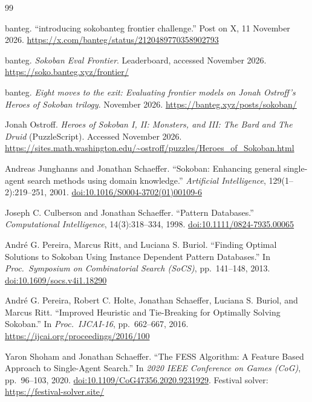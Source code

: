 \documentclass[11pt,a4paper]{article}
\begin{document}
{\raggedright
\begin{thebibliography}{99}

banteg. ``introducing sokobanteg frontier challenge.'' Post on X, 11 November 2026. \url{https://x.com/banteg/status/2120489770358902793}

banteg. \emph{Sokoban Eval Frontier}. Leaderboard, accessed November 2026. \url{https://soko.banteg.xyz/frontier/}

banteg. \emph{Eight moves to the exit: Evaluating frontier models on Jonah Ostroff's Heroes of Sokoban trilogy}. November 2026. \url{https://banteg.xyz/posts/sokoban/}

Jonah Ostroff. \emph{Heroes of Sokoban I, II: Monsters, and III: The Bard and The Druid} (PuzzleScript). Accessed November 2026. \url{https://sites.math.washington.edu/~ostroff/puzzles/Heroes_of_Sokoban.html}

Andreas Junghanns and Jonathan Schaeffer. ``Sokoban: Enhancing general single-agent search methods using domain knowledge.'' \emph{Artificial Intelligence}, 129(1--2):219--251, 2001. \href{https://doi.org/10.1016/S0004-3702(01)00109-6}{doi:10.1016/S0004-3702(01)00109-6}

Joseph C. Culberson and Jonathan Schaeffer. ``Pattern Databases.'' \emph{Computational Intelligence}, 14(3):318--334, 1998. \href{https://doi.org/10.1111/0824-7935.00065}{doi:10.1111/0824-7935.00065}

Andr\'e G. Pereira, Marcus Ritt, and Luciana S. Buriol. ``Finding Optimal Solutions to Sokoban Using Instance Dependent Pattern Databases.'' In \emph{Proc.\ Symposium on Combinatorial Search (SoCS)}, pp.\ 141--148, 2013. \href{https://doi.org/10.1609/socs.v4i1.18290}{doi:10.1609/socs.v4i1.18290}

Andr\'e G. Pereira, Robert C. Holte, Jonathan Schaeffer, Luciana S. Buriol, and Marcus Ritt. ``Improved Heuristic and Tie-Breaking for Optimally Solving Sokoban.'' In \emph{Proc.\ IJCAI-16}, pp.\ 662--667, 2016. \url{https://ijcai.org/proceedings/2016/100}

Yaron Shoham and Jonathan Schaeffer. ``The FESS Algorithm: A Feature Based Approach to Single-Agent Search.'' In \emph{2020 IEEE Conference on Games (CoG)}, pp.\ 96--103, 2020. \href{https://doi.org/10.1109/CoG47356.2020.9231929}{doi:10.1109/CoG47356.2020.9231929}. Festival solver: \url{https://festival-solver.site/}


\end{thebibliography}}
\end{document}
